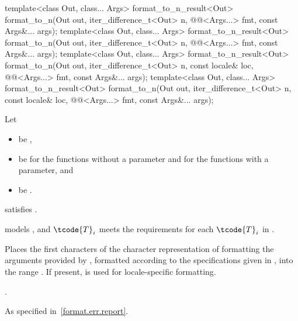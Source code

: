 %
\begin{itemdecl}
template<class Out, class... Args>
  format_to_n_result<Out> format_to_n(Out out, iter_difference_t<Out> n,
                                      @@<Args...> fmt, const Args&... args);
template<class Out, class... Args>
  format_to_n_result<Out> format_to_n(Out out, iter_difference_t<Out> n,
                                      @@<Args...> fmt, const Args&... args);
template<class Out, class... Args>
  format_to_n_result<Out> format_to_n(Out out, iter_difference_t<Out> n,
                                      const locale& loc, @@<Args...> fmt,
                                      const Args&... args);
template<class Out, class... Args>
  format_to_n_result<Out> format_to_n(Out out, iter_difference_t<Out> n,
                                      const locale& loc, @@<Args...> fmt,
                                      const Args&... args);
\end{itemdecl}

\begin{itemdescr}
\pnum
Let
\begin{itemize}
\item {} be ,
\item {} be
 for the functions without a  parameter and
 for the functions with a  parameter, and
\item {} be .
\end{itemize}

\pnum
\constraints
{} satisfies .

\pnum
\expects
{} models , and
$\tcode{T}_i$
meets the  requirements
for each $\tcode{T}_i$ in .

\pnum
\effects
Places the first  characters of the character representation of
formatting the arguments provided by ,
formatted according to the specifications given in ,
into the range .
If present,  is used for locale-specific formatting.

\pnum
\returns
{}.

\pnum
\throws
As specified in~\ref{format.err.report}.
\end{itemdescr}

